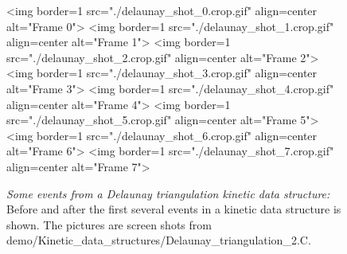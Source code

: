 \begin{figure}[htb]
\begin{ccTexOnly}
\begin{center}
\end{center}
\end{ccTexOnly}
\begin{ccHtmlOnly}
<img border=1 src="./delaunay_shot_0.crop.gif" align=center alt="Frame 0">
<img border=1 src="./delaunay_shot_1.crop.gif" align=center alt="Frame 1">
<img border=1 src="./delaunay_shot_2.crop.gif" align=center alt="Frame 2">
<img border=1 src="./delaunay_shot_3.crop.gif" align=center alt="Frame 3">
<img border=1 src="./delaunay_shot_4.crop.gif" align=center alt="Frame 4">
<img border=1 src="./delaunay_shot_5.crop.gif" align=center alt="Frame 5">
<img border=1 src="./delaunay_shot_6.crop.gif" align=center alt="Frame 6">
<img border=1 src="./delaunay_shot_7.crop.gif" align=center alt="Frame 7">
\end{ccHtmlOnly}
\caption{ \label{fig:delaunay_events} 
{\em Some events from a Delaunay triangulation kinetic data structure:} Before and after the first several events in a kinetic data structure is shown. The pictures are screen shots from demo/Kinetic\_data\_structures/Delaunay\_triangulation\_2.C. }
\end{figure}


\label{fig:delaunay_2_usage_program}
